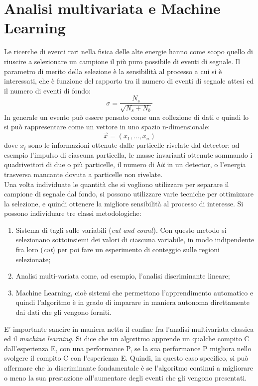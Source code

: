 \section{Analisi multivariata e Machine Learning}
\label{analisi multivariata e ML}

Le ricerche di eventi rari nella fisica delle alte energie hanno come scopo quello di riuscire a selezionare un campione il più puro possibile di eventi di segnale. Il parametro di merito della selezione è la sensibilità al processo a cui si è interessati, che è funzione del rapporto tra il numero di eventi di segnale attesi ed il numero di eventi di fondo: 
\begin{equation}
	\sigma = \frac{N_s}{\sqrt{N_s + N_b}}
\end{equation}
In generale un evento può essere pensato come una collezione di dati e quindi lo si può rappresentare come un vettore in uno spazio n-dimensionale: 
\begin{equation}
\vec{x} = (x_{1},...,x_{n})
\end{equation}
dove $x_i$ sono le informazioni ottenute dalle particelle rivelate dal detector: ad esempio l'impulso di ciascuna particella, le masse invarianti ottenute sommando i quadrivettori di due o più particelle, il numero di \textit{hit} in un detector, o l'energia trasversa mancante dovuta a particelle non rivelate. \\
Una volta individuate le quantità che si vogliono utilizzare per separare il campione di segnale dal fondo, si possono utilizzare varie tecniche per ottimizzare la selezione, e quindi ottenere la migliore sensibilità al processo di interesse. Si possono individuare tre classi metodologiche:

\begin{enumerate}
	\item Sistema di tagli sulle variabili (\textit{cut and count}). Con questo metodo si selezionano sottoinsiemi dei valori di ciascuna variabile, in modo indipendente fra loro (\textit{cut}) per poi fare un esperimento di conteggio sulle regioni selezionate;
	\item Analisi multi-variata come, ad esempio, l'analisi discriminante lineare;
	\item Machine Learning, cioè sistemi che permettono l'apprendimento automatico e quindi l'algoritmo è in grado di imparare in maniera autonoma direttamente dai dati che gli vengono forniti.
\end{enumerate}
E' importante sancire in maniera netta il confine fra l'analisi multivariata classica ed il \textit{machine learning}. Si dice che un algoritmo apprende un qualche compito C dall'esperienza E, con una performance P, se la sua performance P migliora nello svolgere il compito C con l'esperienza E. Quindi, in questo caso specifico, si può affermare che la discriminante fondamentale è se l'algoritmo continui a migliorare o meno la sua prestazione all'aumentare degli eventi che gli vengono presentati.


